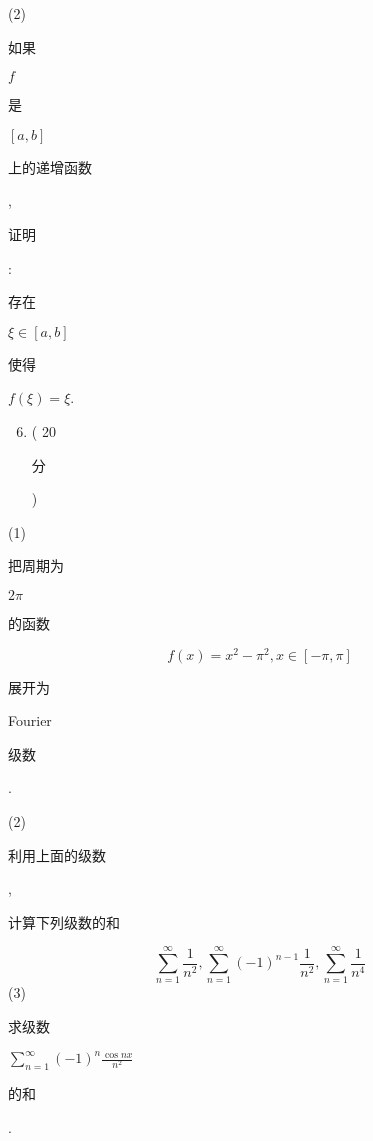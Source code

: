 \documentclass[10pt]{article}
\begin{document}
(2) \begin{CJK}{UTF8}{mj}如果\end{CJK} $f$ \begin{CJK}{UTF8}{mj}是\end{CJK} $[a, b]$ \begin{CJK}{UTF8}{mj}上的递增函数\end{CJK}, \begin{CJK}{UTF8}{mj}证明\end{CJK}: \begin{CJK}{UTF8}{mj}存在\end{CJK} $\xi \in[a, b]$ \begin{CJK}{UTF8}{mj}使得\end{CJK} $f(\xi)=\xi$.

\begin{enumerate}
  \setcounter{enumi}{5}
  \item ( 20 \begin{CJK}{UTF8}{mj}分\end{CJK})
\end{enumerate}
(1) \begin{CJK}{UTF8}{mj}把周期为\end{CJK} $2 \pi$ \begin{CJK}{UTF8}{mj}的函数\end{CJK}
$$
f(x)=x^{2}-\pi^{2}, x \in[-\pi, \pi]
$$
\begin{CJK}{UTF8}{mj}展开为\end{CJK} Fourier \begin{CJK}{UTF8}{mj}级数\end{CJK}.

(2) \begin{CJK}{UTF8}{mj}利用上面的级数\end{CJK}, \begin{CJK}{UTF8}{mj}计算下列级数的和\end{CJK}
$$
\sum_{n=1}^{\infty} \frac{1}{n^{2}}, \sum_{n=1}^{\infty}(-1)^{n-1} \frac{1}{n^{2}}, \sum_{n=1}^{\infty} \frac{1}{n^{4}}
$$
(3) \begin{CJK}{UTF8}{mj}求级数\end{CJK} $\sum_{n=1}^{\infty}(-1)^{n} \frac{\cos n x}{n^{2}}$ \begin{CJK}{UTF8}{mj}的和\end{CJK}.
\end{document}
